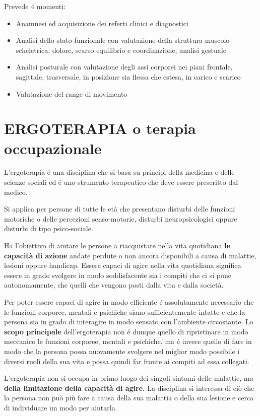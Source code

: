 Prevede 4 momenti:

\begin{itemize}
\item
  Anamnesi ed acquisizione dei referti clinici e diagnostici
\item
  Analisi dello stato funzionale con valutazione della struttura
  muscolo-scheletrica, dolore, scarso equilibrio e coordinazione,
  analisi gestuale
\item
  Analisi posturale con valutazione degli assi corporei nei piani
  frontale, sagittale, trasversale, in posizione sia flessa che estesa,
  in carico e scarico
\item
  Valutazione del range di movimento
\end{itemize}

 
\section{ERGOTERAPIA o terapia occupazionale}



L'ergoterapia é una disciplina che si basa su principi della medicina e
delle scienze sociali ed é uno strumento terapeutico che deve essere
prescritto dal medico.

Si applica per persone di tutte le età che presentano disturbi delle
funzioni motoriche o delle percezioni senso-motorie, disturbi
neuropsicologici oppure disturbi di tipo psico-sociale.

Ha l'obiettivo di aiutare le persone a riacquistare nella vita
quotidiana \textbf{le capacità di azione} andate perdute o non ancora
disponibili a causa di malattie, lesioni oppure handicap. Essere capaci
di agire nella vita quotidiana significa essere in grado svolgere in
modo soddisfacente sia i compiti che ci si pone autonomamente, che
quelli che vengono posti dalla vita e dalla società.

Per poter essere capaci di agire in modo efficiente é assolutamente
necessario che le funzioni corporee, mentali e psichiche siano
sufficientemente intatte e che la persona sia in grado di interagire in
modo sensato con l'ambiente circostante. Lo \textbf{scopo principale}
dell'ergoterapia non é dunque quello di ripristinare in modo meccanico
le funzioni corporee, mentali e psichiche, ma é invece quello di fare in
modo che la persona possa nuovamente svolgere nel miglior modo possibile
i diversi ruoli della sua vita e possa quindi far fronte ai compiti ad
essa collegati.

L'ergoterapia non si occupa in primo luogo dei singoli sintomi delle
malattie, ma \textbf{della limitazione della capacità di agire.} La
disciplina si interessa di ciò che la persona non può più fare a causa
della sua malattia o della sua lesione e cerca di individuare un modo
per aiutarla.

